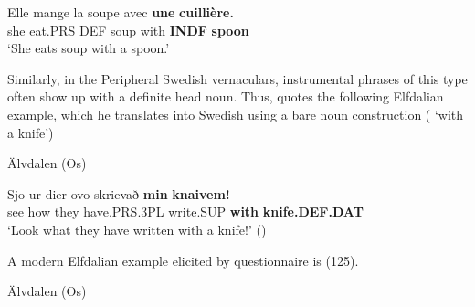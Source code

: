  \ea\label{}
\gll Elle  mange  la  soupe  avec  \textbf{une} \textbf{cuillière.}\\


she  eat.PRS  DEF  soup  with  \textbf{INDF} \textbf{spoon}\\

\glt ‘She eats soup with a spoon.’

\z

Similarly, in the Peripheral Swedish vernaculars, instrumental phrases of this type often show up with a definite head noun. Thus, \citet[126]{Levander1909} quotes the following Elfdalian example, which he translates into Swedish using a bare noun construction ( ‘with a knife’)


\item 

Älvdalen (Os)



 \ea\label{}
\gll Sjo  ur  dier  ovo  skrievað  \textbf{min}\textbf{  knaivem!}\\


see  how  they  have.PRS.3PL  write.SUP  \textbf{with} \textbf{knife.DEF.DAT}\\

\glt ‘Look what they have written with a knife!’ (\citet[125]{Levander1909})

\z

A modern Elfdalian example elicited by questionnaire is (125).


\item 

\label{bkm:Ref224103303}Älvdalen (Os)



